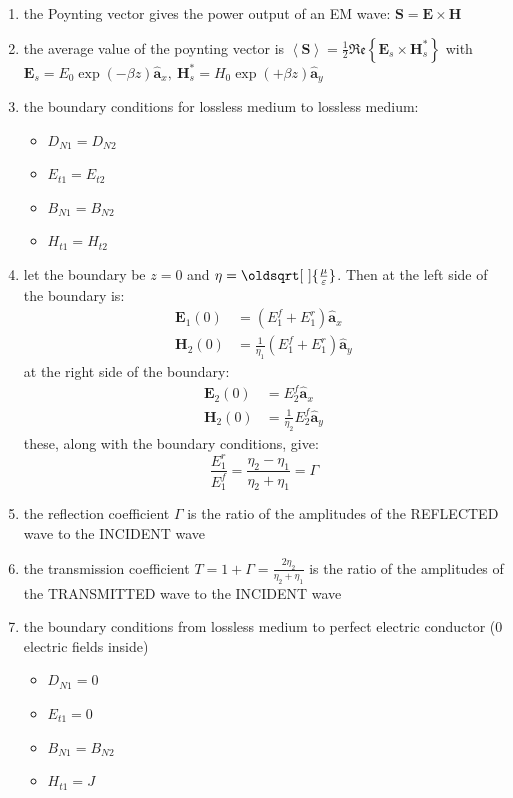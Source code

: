 \documentclass[a4paper,11pt]{article}
\renewcommand*{\sqrt}[2][\ ]{\oldsqrt[#1]{#2}}
\newcommand{\bvec}[1]{\mathbf{#1}}
\newcommand{\uvec}[1]{\hat{\mathbf{a}}_{#1} }
\begin{document}
\begin{enumerate}
		\item the Poynting vector gives the power output of an EM wave: $\bvec{S} = \bvec{E}\times \bvec{H}$
		\item the average value of the poynting vector is $\left\langle \bvec{S} \right\rangle = \frac{1}{2}\mathfrak{Re}\left\{\bvec{E}_s\times\bvec{H}_s^*\right\}$ with $\bvec{E}_s = E_0\exp\left(-\beta z\right)\uvec{x},~\bvec{H}_s^* = H_0\exp\left(+\beta z\right)\uvec{y}$
		\item the boundary conditions for lossless medium to lossless medium:
			\begin{itemize}
				\item $D_{N1} = D_{N2}$
				\item $E_{t1} = E_{t2}$
				\item $B_{N1} = B_{N2}$
				\item $H_{t1} = H_{t2}$
			\end{itemize}
		\item let the boundary be $z = 0$ and $\eta = \sqrt{\frac{\mu}{\varepsilon}}$. Then at the left side of the boundary is: 
			\begin{align*}
				\bvec{E}_1(0) &= (E_1^f + E_1^r)\uvec{x} \\
				\bvec{H}_2(0) &= \frac{1}{\eta_1}(E_1^f + E_1^r)\uvec{y}
			\end{align*}
		at the right side of the boundary:
			\begin{align*}
				\bvec{E}_2(0) &= E_2^f\uvec{x} \\
				\bvec{H}_2(0) &= \frac{1}{\eta_2}E_2^f\uvec{y}
			\end{align*}	
		these, along with the boundary conditions, give: $$\frac{E_1^r}{E_1^f} = \frac{\eta_2 - \eta_1}{\eta_2 + \eta_1} = \Gamma $$ 	
		\item the reflection coefficient $\Gamma$ is the ratio of the amplitudes of the REFLECTED wave to the INCIDENT wave
		\item the transmission coefficient $T = 1 + \Gamma = \frac{2\eta_2}{\eta_2 + \eta_1}$ is the ratio of the amplitudes of the TRANSMITTED wave to the INCIDENT wave
		\item the boundary conditions from lossless medium to perfect electric conductor (0 electric fields inside)
			\begin{itemize}
				\item $D_{N1} = 0$
				\item $E_{t1} = 0$
				\item $B_{N1} = B_{N2}$
				\item $H_{t1} = J$

\end{itemize}
\end{enumerate}
\end{document}
